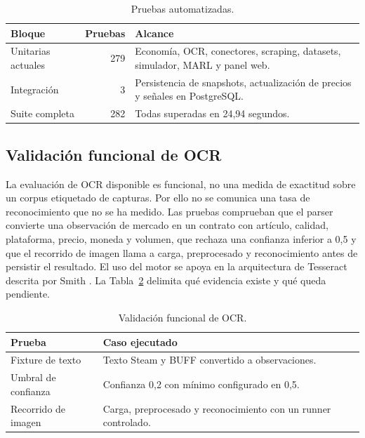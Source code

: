 \begin{table}[htbp]
\centering
\begin{tabularx}{\textwidth}{>{\raggedright\arraybackslash}p{} r >{\raggedright\arraybackslash}X}
\toprule
Bloque & Pruebas & Alcance \\
\midrule
Unitarias actuales & 279 & Economía, OCR, conectores, scraping, datasets, simulador, MARL y panel web. \\
Integración & 3 & Persistencia de snapshots, actualización de precios y señales en PostgreSQL. \\
Suite completa & 282 & Todas superadas en 24,94 segundos. \\
\bottomrule
\end{tabularx}
\caption{Pruebas automatizadas.}
\label{tab:pruebas-recuperadas}
\end{table}

\subsection{Validación funcional de OCR}

La evaluación de OCR disponible es funcional, no una medida de exactitud sobre un corpus etiquetado de capturas. Por ello no se comunica una tasa de reconocimiento que no se ha medido. Las pruebas comprueban que el parser convierte una observación de mercado en un contrato con artículo, calidad, plataforma, precio, moneda y volumen, que rechaza una confianza inferior a 0,5 y que el recorrido de imagen llama a carga, preprocesado y reconocimiento antes de persistir el resultado. El uso del motor se apoya en la arquitectura de Tesseract descrita por Smith \cite{smith2007tesseract}. La Tabla~\ref{tab:ocr-funcional} delimita qué evidencia existe y qué queda pendiente.

\begin{table}[htbp]
\centering
\begin{tabularx}{\textwidth}{>{\raggedright\arraybackslash}p{} >{\raggedright\arraybackslash}X}
\toprule
Prueba & Caso ejecutado \\
\midrule
Fixture de texto & Texto Steam y BUFF convertido a observaciones. \\
Umbral de confianza & Confianza 0,2 con mínimo configurado en 0,5. \\
Recorrido de imagen & Carga, preprocesado y reconocimiento con un runner controlado. \\
\bottomrule
\end{tabularx}
\caption{Validación funcional de OCR.}
\label{tab:ocr-funcional}
\end{table}

